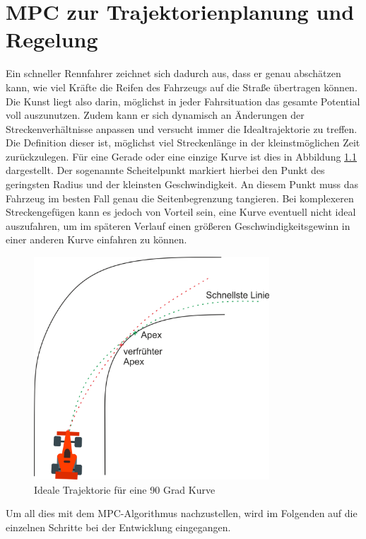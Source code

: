 \documentclass{like}
\begin{document}
\chapter{MPC zur Trajektorienplanung und Regelung}

Ein schneller Rennfahrer zeichnet sich dadurch aus, dass er genau abschätzen kann, wie viel Kräfte die Reifen des Fahrzeugs auf die Straße übertragen können. Die Kunst liegt also darin, möglichst in jeder Fahrsituation das gesamte Potential voll auszunutzen. Zudem kann er sich dynamisch an Änderungen der Streckenverhältnisse anpassen und versucht immer die Idealtrajektorie zu treffen. Die Definition dieser ist, möglichst viel Streckenlänge in der kleinstmöglichen Zeit zurückzulegen. Für eine Gerade oder eine einzige Kurve ist dies in Abbildung \ref{fig:idealTrajektorie} dargestellt. Der sogenannte Scheitelpunkt markiert hierbei den Punkt des geringsten Radius und der kleinsten Geschwindigkeit. An diesem Punkt muss das Fahrzeug im besten Fall genau die Seitenbegrenzung tangieren. 
Bei komplexeren Streckengefügen kann es jedoch von Vorteil sein, eine Kurve eventuell nicht ideal auszufahren, um im späteren Verlauf einen größeren Geschwindigkeitsgewinn in einer anderen Kurve einfahren zu können.

\begin{figure}[ht!]
	\centering
	\includegraphics[width=250pt]{Abbildungen/apexTrajektory.png}
	\caption{Ideale Trajektorie für eine 90 Grad Kurve}
	\label{fig:idealTrajektorie}
\end{figure}


Um all dies mit dem \ac{MPC}-Algorithmus nachzustellen, wird im Folgenden auf die einzelnen Schritte bei der Entwicklung eingegangen.
\end{document}
